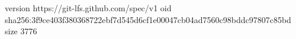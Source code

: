version https://git-lfs.github.com/spec/v1
oid sha256:3f9ce403f380368722ebf7d545d6cf1e00047cb04ad7560c98bddc97807c85bd
size 3776
